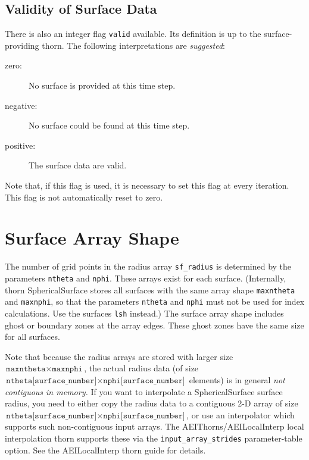 \subsection{Validity of Surface Data}

There is also an integer flag \texttt{valid} available.  Its
definition is up to the surface-providing thorn.  The following
interpretations are \emph{suggested}:
\begin{description}

\item[zero:] No surface is provided at this time step.

\item[negative:] No surface could be found at this time step.

\item[positive:] The surface data are valid.

\end{description}
Note that, if this flag is used, it is necessary to set this flag at
every iteration.  This flag is not automatically reset to zero.



\section{Surface Array Shape}

The number of grid points in the radius array \texttt{sf\_radius} is
determined by the parameters \texttt{ntheta} and \texttt{nphi}.  These
arrays exist for each surface.  (Internally, thorn SphericalSurface
stores all surfaces with the same array shape \texttt{maxntheta} and
\texttt{maxnphi}, so that the parameters  \texttt{ntheta} and
\texttt{nphi} must not be used for index calculations.  Use the
surfaces \texttt{lsh} instead.)  The surface array shape includes
ghost or boundary zones at the array edges.  These ghost zones have
the same size for all surfaces.

Note that because the radius arrays are stored with larger size
$\texttt{maxntheta} \times \texttt{maxnphi}$, the actual radius data
(of size
$\texttt{ntheta[surface\_number]} \times \texttt{nphi[surface\_number]}$
elements) is in general {\em not contiguous in memory.\/}
If you want to interpolate a SphericalSurface surface radius,
you need to either copy the radius data to a contiguous 2-D array of size
$\texttt{ntheta[surface\_number]} \times \texttt{nphi[surface\_number]}$,
or use an interpolator which supports such non-contiguous input arrays.
The AEIThorns/AEILocalInterp local interpolation thorn supports these
via the \texttt{input\_array\_strides} parameter-table option.
See the AEILocalInterp thorn guide for details.




